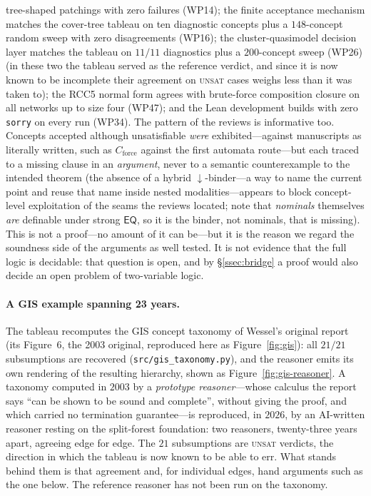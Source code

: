 \documentclass[11pt]{article}
\newcommand{\EQ}{\mathsf{EQ}}
\theoremstyle{plain}
\theoremstyle{definition}
\begin{document}
tree-shaped patchings with zero failures (WP14); the finite acceptance
mechanism matches the cover-tree tableau on ten diagnostic concepts plus a
$148$-concept random sweep with zero disagreements (WP16); the
cluster-quasimodel decision layer matches the tableau on $11/11$
diagnostics plus a $200$-concept sweep (WP26) (in these two the tableau served
as the reference verdict, and since it is now known to be incomplete their
agreement on \textsc{unsat} cases weighs less than it was taken to); the RCC5
normal form agrees
with brute-force composition closure on all networks up to size four
(WP47); and the Lean development builds with zero \texttt{sorry} on every
run (WP34). The pattern of the reviews is informative too. Concepts accepted
although unsatisfiable \emph{were} exhibited---against manuscripts as
literally written, such as $C_{\mathrm{force}}$ against the first automata
route---but each traced to a missing clause in an \emph{argument}, never to a
semantic counterexample to the intended theorem
(the absence of a hybrid $\downarrow$-binder---a way to name the current
point and reuse that name inside nested modalities---appears to block
concept-level exploitation of the seams the reviews located; note that
\emph{nominals} themselves \emph{are} definable under strong $\EQ$, so it is
the binder, not nominals, that is missing). This is not
a proof---no amount of it can be---but it is the reason we regard the
soundness side of the arguments as well tested. It is not evidence that the
full logic is decidable: that question is open, and by \S\ref{ssec:bridge} a
proof would also decide an open problem of two-variable logic.

\paragraph{A GIS example spanning 23 years.} The tableau recomputes the
GIS concept taxonomy of Wessel's original report~\cite{Wessel2003} (its
Figure~6, the 2003 original, reproduced here as
Figure~\ref{fig:gis}): all $21/21$ subsumptions are recovered
(\texttt{src/gis\_taxonomy.py}), and the reasoner emits its own rendering
of the resulting hierarchy, shown as Figure~\ref{fig:gis-reasoner}. A
taxonomy computed in $2003$ by a \emph{prototype reasoner}---whose calculus
the report says ``can be shown to be sound and complete'', without giving the
proof, and which carried no termination guarantee---is reproduced, in $2026$,
by an AI-written reasoner resting on the split-forest foundation: two
reasoners, twenty-three years apart, agreeing edge for edge. The $21$
subsumptions are \textsc{unsat} verdicts, the direction in which the tableau
is now known to be able to err. What stands behind them is that agreement
and, for individual edges, hand arguments such as the one below. The
reference reasoner has not been run on the taxonomy.
\end{document}

